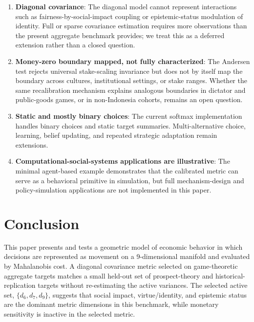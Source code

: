 \documentclass[journal]{IEEEtran}
\begin{document}
\begin{enumerate}
    \item \textbf{Diagonal covariance}: The diagonal model cannot represent interactions such as fairness-by-social-impact coupling or epistemic-status modulation of identity. Full or sparse covariance estimation requires more observations than the present aggregate benchmark provides; we treat this as a deferred extension rather than a closed question.
    \item \textbf{Money-zero boundary mapped, not fully characterized}: The Andersen test rejects universal stake-scaling invariance but does not by itself map the boundary across cultures, institutional settings, or stake ranges. Whether the same recalibration mechanism explains analogous boundaries in dictator and public-goods games, or in non-Indonesia cohorts, remains an open question.
    \item \textbf{Static and mostly binary choices}: The current softmax implementation handles binary choices and static target summaries. Multi-alternative choice, learning, belief updating, and repeated strategic adaptation remain extensions.
    \item \textbf{Computational-social-systems applications are illustrative}: The minimal agent-based example demonstrates that the calibrated metric can serve as a behavioral primitive in simulation, but full mechanism-design and policy-simulation applications are not implemented in this paper.
\end{enumerate}

\section{Conclusion}
\label{sec:conclusion}

This paper presents and tests a geometric model of economic behavior in which decisions are represented as movement on a 9-dimensional manifold and evaluated by Mahalanobis cost.
A diagonal covariance metric selected on game-theoretic aggregate targets matches a small held-out set of prospect-theory and historical-replication targets without re-estimating the active variances.
The selected active set, $\{d_6,d_7,d_9\}$, suggests that social impact, virtue/identity, and epistemic status are the dominant metric dimensions in this benchmark, while monetary sensitivity is inactive in the selected metric.
\end{document}
